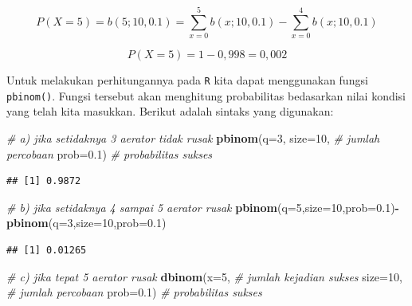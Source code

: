 \documentclass[]{book}
\newenvironment{Shaded}{\begin{snugshade}}{\end{snugshade}}
\newcommand{\KeywordTok}[1]{\textcolor[rgb]{0.13,0.29,0.53}{\textbf{#1}}}
\newcommand{\DataTypeTok}[1]{\textcolor[rgb]{0.13,0.29,0.53}{#1}}
\newcommand{\DecValTok}[1]{\textcolor[rgb]{0.00,0.00,0.81}{#1}}
\newcommand{\FloatTok}[1]{\textcolor[rgb]{0.00,0.00,0.81}{#1}}
\newcommand{\CommentTok}[1]{\textcolor[rgb]{0.56,0.35,0.01}{\textit{#1}}}
\newcommand{\OperatorTok}[1]{\textcolor[rgb]{0.81,0.36,0.00}{\textbf{#1}}}
\newcommand{\NormalTok}[1]{#1}
\begin{document}
\[
P\left(X=5\right)=b\left(5;10,0.1\right)=\sum_{x=0}^5b\left(x;10,0.1\right)-\sum_{x=0}^4b\left(x;10,0.1\right)
\]

\[
P\left(X=5\right)=1-0,998=0,002
\]

Untuk melakukan perhitungannya pada \texttt{R} kita dapat menggunakan
fungsi \texttt{pbinom()}. Fungsi tersebut akan menghitung probabilitas
bedasarkan nilai kondisi yang telah kita masukkan. Berikut adalah
sintaks yang digunakan:

\begin{Shaded}
\begin{Highlighting}[]
\CommentTok{# a) jika setidaknya 3 aerator tidak rusak}
\KeywordTok{pbinom}\NormalTok{(}\DataTypeTok{q=}\DecValTok{3}\NormalTok{,  }
       \DataTypeTok{size=}\DecValTok{10}\NormalTok{, }\CommentTok{# jumlah percobaan}
       \DataTypeTok{prob=}\FloatTok{0.1}\NormalTok{) }\CommentTok{# probabilitas sukses}
\end{Highlighting}
\end{Shaded}

\begin{verbatim}
## [1] 0.9872
\end{verbatim}

\begin{Shaded}
\begin{Highlighting}[]
\CommentTok{# b) jika setidaknya 4 sampai 5 aerator rusak}
\KeywordTok{pbinom}\NormalTok{(}\DataTypeTok{q=}\DecValTok{5}\NormalTok{,}\DataTypeTok{size=}\DecValTok{10}\NormalTok{,}\DataTypeTok{prob=}\FloatTok{0.1}\NormalTok{)}\OperatorTok{-}\KeywordTok{pbinom}\NormalTok{(}\DataTypeTok{q=}\DecValTok{3}\NormalTok{,}\DataTypeTok{size=}\DecValTok{10}\NormalTok{,}\DataTypeTok{prob=}\FloatTok{0.1}\NormalTok{) }
\end{Highlighting}
\end{Shaded}

\begin{verbatim}
## [1] 0.01265
\end{verbatim}

\begin{Shaded}
\begin{Highlighting}[]
\CommentTok{# c) jika tepat 5 aerator rusak}
\KeywordTok{dbinom}\NormalTok{(}\DataTypeTok{x=}\DecValTok{5}\NormalTok{, }\CommentTok{# jumlah kejadian sukses}
       \DataTypeTok{size=}\DecValTok{10}\NormalTok{, }\CommentTok{# jumlah percobaan}
       \DataTypeTok{prob=}\FloatTok{0.1}\NormalTok{) }\CommentTok{# probabilitas sukses}
\end{Highlighting}
\end{Shaded}
\end{document}
